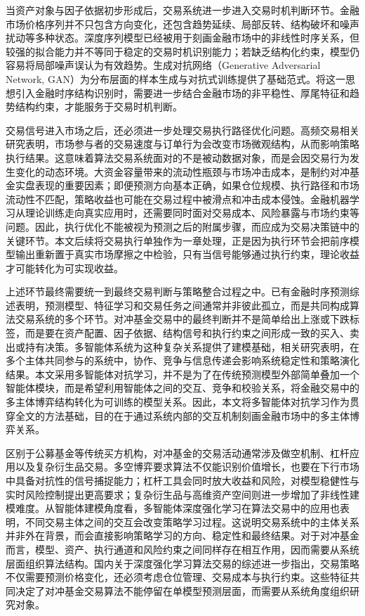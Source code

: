当资产对象与因子依据初步形成后，交易系统进一步进入交易时机判断环节。金融市场价格序列并不只包含方向变化，还包含趋势延续、局部反转、结构破坏和噪声扰动等多种状态。深度序列模型已经被用于刻画金融市场中的非线性时序关系\cite{fischer2018deep}，但较强的拟合能力并不等同于稳定的交易时机识别能力；若缺乏结构化约束，模型仍容易将局部噪声误认为有效趋势。生成对抗网络（Generative Adversarial Network, GAN）为分布层面的样本生成与对抗式训练提供了基础范式\cite{goodfellow2014generative}。将这一思想引入金融时序结构识别时，需要进一步结合金融市场的非平稳性、厚尾特征和趋势结构约束，才能服务于交易时机判断。

交易信号进入市场之后，还必须进一步处理交易执行路径优化问题。高频交易相关研究表明，市场参与者的交易速度与订单行为会改变市场微观结构，从而影响策略执行结果\cite{ba2019highfreq}。这意味着算法交易系统面对的不是被动数据对象，而是会因交易行为发生变化的动态环境。大资金容量带来的流动性瓶颈与市场冲击成本，是制约对冲基金实盘表现的重要因素；即便预测方向基本正确，如果仓位规模、执行路径和市场流动性不匹配，策略收益也可能在交易过程中被滑点和冲击成本侵蚀。金融机器学习从理论训练走向真实应用时，还需要同时面对交易成本、风险暴露与市场约束等问题\cite{dixon2020machine}。因此，执行优化不能被视为预测之后的附属步骤，而应成为交易决策链中的关键环节。本文后续将交易执行单独作为一章处理，正是因为执行环节会把前序模型输出重新置于真实市场摩擦之中检验，只有当信号能够通过执行约束，理论收益才可能转化为可实现收益。

上述环节最终需要统一到最终交易判断与策略整合过程之中。已有金融时序预测综述表明，预测模型、特征学习和交易任务之间通常并非彼此孤立，而是共同构成算法交易系统的多个环节\cite{sezer2020financial_timeseries_review}。对冲基金交易中的最终判断并不是简单给出上涨或下跌标签，而是要在资产配置、因子依据、结构信号和执行约束之间形成一致的买入、卖出或持有决策。多智能体系统为这种复杂关系提供了建模基础，相关研究表明，在多个主体共同参与的系统中，协作、竞争与信息传递会影响系统稳定性和策略演化结果\cite{liang2020multiagent}。本文采用多智能体对抗学习，并不是为了在传统预测模型外部简单叠加一个智能体模块，而是希望利用智能体之间的交互、竞争和校验关系，将金融交易中的多主体博弈结构转化为可训练的模型关系。因此，本文将多智能体对抗学习作为贯穿全文的方法基础，目的在于通过系统内部的交互机制刻画金融市场中的多主体博弈关系。

区别于公募基金等传统买方机构，对冲基金的交易活动通常涉及做空机制、杠杆应用以及复杂衍生品交易。多空博弈要求算法不仅能识别价值增长，也要在下行市场中具备对抗性的信号捕捉能力；杠杆工具会同时放大收益和风险，对模型稳健性与实时风险控制提出更高要求；复杂衍生品与高维资产空间则进一步增加了非线性建模难度。从智能体建模角度看，多智能体深度强化学习在算法交易中的应用也表明，不同交易主体之间的交互会改变策略学习过程\cite{shavandi2022multiagent}。这说明交易系统中的主体关系并非外在背景，而会直接影响策略学习的方向、稳定性和最终结果。对于对冲基金而言，模型、资产、执行通道和风险约束之间同样存在相互作用，因而需要从系统层面组织算法结构。国内关于深度强化学习算法交易的综述进一步指出，交易策略不仅需要预测价格变化，还必须考虑仓位管理、交易成本与执行约束\cite{ning2020survey}。这些特征共同决定了对冲基金交易算法不能停留在单模型预测层面，而需要从系统角度组织研究对象。

